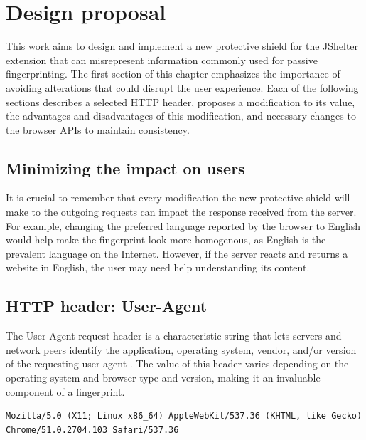 
\chapter{Design proposal}
\label{Chapter:Design}

This work aims to design and implement a new protective shield for the JShelter extension that can misrepresent information commonly used for passive fingerprinting. The first section of this chapter emphasizes the importance of avoiding alterations that could disrupt the user experience. Each of the following sections describes a selected HTTP header, proposes a modification to its value, the advantages and disadvantages of this modification, and necessary changes to the browser APIs to maintain consistency.

\section{Minimizing the impact on users}

It is crucial to remember that every modification the new protective shield will make to the outgoing requests can impact the response received from the server. For example, changing the preferred language reported by the browser to English would help make the fingerprint look more homogenous, as English is the prevalent language on the Internet. However, if the server reacts and returns a website in English, the user may need help understanding its content.

\section{HTTP header: User-Agent}
\label{SectionHTTPHeaderUserAgent}

The User-Agent request header is a characteristic string that lets servers and network peers identify the application, operating system, vendor, and/or version of the requesting user agent \cite{MDNHeaderUserAgent}. The value of this header varies depending on the operating system and browser type and version, making it an invaluable component of a fingerprint.

\bigbreak

\begin{lstlisting}[caption={An example of Chrome User-Agent string \cite{MDNHeaderUserAgent}.}, label={Listing:UserAgentChrome}]
Mozilla/5.0 (X11; Linux x86_64) AppleWebKit/537.36 (KHTML, like Gecko) Chrome/51.0.2704.103 Safari/537.36
\end{lstlisting}

